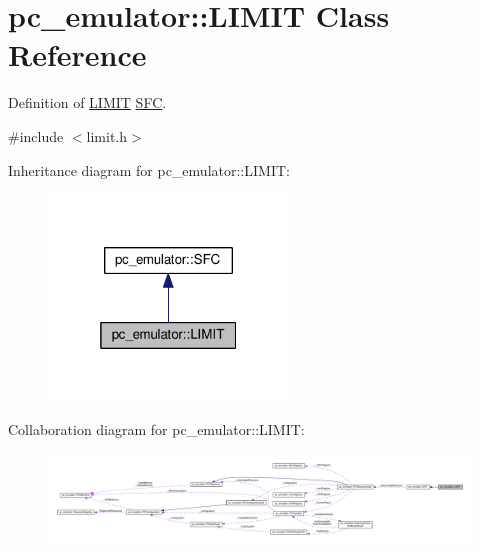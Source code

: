 \hypertarget{classpc__emulator_1_1LIMIT}{}\section{pc\+\_\+emulator\+:\+:L\+I\+M\+IT Class Reference}
\label{classpc__emulator_1_1LIMIT}


Definition of \hyperlink{classpc__emulator_1_1LIMIT}{L\+I\+M\+IT} \hyperlink{classpc__emulator_1_1SFC}{S\+FC}.  




{\ttfamily \#include $<$limit.\+h$>$}



Inheritance diagram for pc\+\_\+emulator\+:\+:L\+I\+M\+IT\+:
\nopagebreak
\begin{figure}[H]
\begin{center}
\leavevmode
\includegraphics[width=181pt]{classpc__emulator_1_1LIMIT__inherit__graph}
\end{center}
\end{figure}


Collaboration diagram for pc\+\_\+emulator\+:\+:L\+I\+M\+IT\+:
\nopagebreak
\begin{figure}[H]
\begin{center}
\leavevmode
\includegraphics[width=350pt]{classpc__emulator_1_1LIMIT__coll__graph}
\end{center}
\end{figure}
